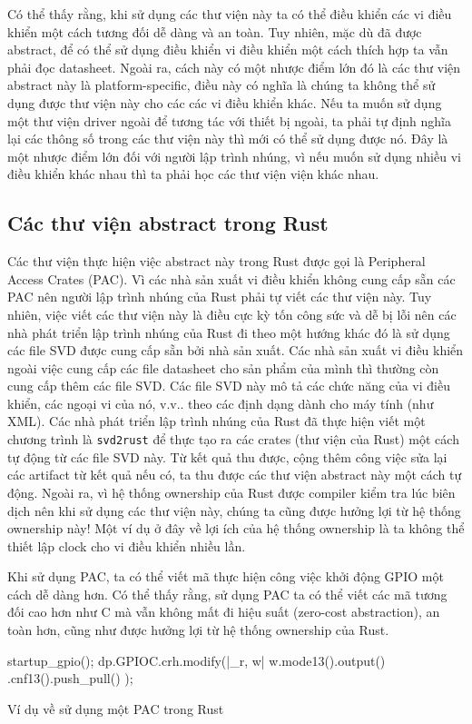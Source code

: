 Có thể thấy rằng, khi sử dụng các thư viện này ta có thể điều khiển các vi điều khiển một cách tương đối dễ dàng và an toàn.
Tuy nhiên, mặc dù đã được abstract, để có thể sử dụng điều khiển vi điều khiển một cách thích hợp ta vẫn phải đọc datasheet.
Ngoài ra, cách này có một nhược điểm lớn đó là các thư viện abstract này là platform-specific, điều này có nghĩa là chúng ta không thể sử dụng được thư viện này cho các các vi điều khiển khác.
Nếu ta muốn sử dụng một thư viện driver ngoài để tương tác với thiết bị ngoài, ta phải tự định nghĩa lại các thông số trong các thư viện này thì mới có thể sử dụng được nó.
Đây là một nhược điểm lớn đối với người lập trình nhúng, vì nếu muốn sử dụng nhiều vi điều khiển khác nhau thì ta phải học các thư viện viện khác nhau.

\subsection{Các thư viện abstract trong Rust}
Các thư viện thực hiện việc abstract này trong Rust được gọi là Peripheral Access Crates (PAC).
Vì các nhà sản xuất vi điều khiển không cung cấp sẵn các PAC nên người lập trình nhúng của Rust phải tự viết các thư viện này.
Tuy nhiên, việc viết các thư viện này là điều cực kỳ tốn công sức và dễ bị lỗi nên các nhà phát triển lập trình nhúng của Rust đi theo một hướng khác đó là sử dụng các file SVD được cung cấp sẵn bởi nhà sản xuất.
Các nhà sản xuất vi điều khiển ngoài việc cung cấp các file datasheet cho sản phẩm của mình thì thường còn cung cấp thêm các file SVD.
Các file SVD này mô tả các chức năng của vi điều khiển, các ngoại vi của nó, v.v.. theo các định dạng dành cho máy tính (như XML).
Các nhà phát triển lập trình nhúng của Rust đã thực hiện viết một chương trình là \texttt{svd2rust} để thực tạo ra các crates (thư viện của Rust) một cách tự động từ các file SVD này.
Từ kết quả thu được, cộng thêm công việc sửa lại các artifact từ kết quả nếu có,
ta thu được các thư viện abstract này một cách tự động.
Ngoài ra, vì hệ thống ownership của Rust được compiler kiểm tra lúc biên dịch nên khi sử dụng các thư viện này, chúng ta cũng được hưởng lợi từ hệ thống ownership này! \cite{frans_overview}
Một ví dụ ở đây về lợi ích của hệ thống ownership là ta không thể thiết lập clock cho vi điều khiển nhiều lần.

Khi sử dụng PAC, ta có thể viết mã thực hiện công việc khởi động GPIO một cách dễ dàng hơn.
Có thể thấy rằng, sử dụng PAC ta có thể viết các mã tương đối cao hơn như C mà vẫn không mất đi hiệu suất (zero-cost abstraction), an toàn hơn, cũng như được hưởng lợi từ hệ thống ownership của Rust.
\begin{listing}[ht]
\begin{rustcode}
startup_gpio();
dp.GPIOC.crh.modify(|_r, w| {
    w.mode13().output()
     .cnf13().push_pull()
});
\end{rustcode}
\caption{Ví dụ về sử dụng một PAC trong Rust}
\end{listing}

